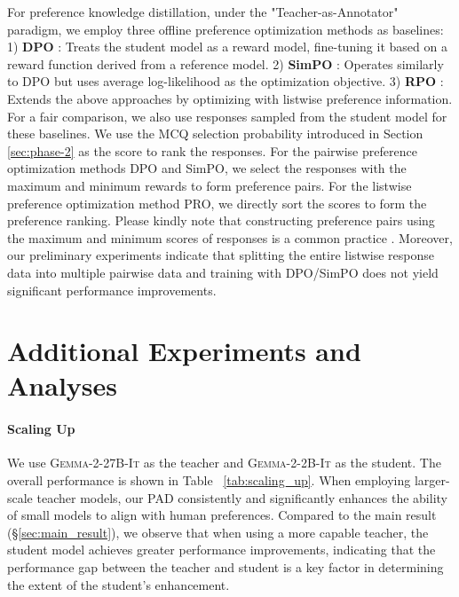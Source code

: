 For preference knowledge distillation, under the "Teacher-as-Annotator" paradigm, we employ three offline preference optimization methods as baselines:
1) \textbf{DPO} \citep{rafailov-2023-direct, tunstall-2024-zephyr}: Treats the student model as a reward model, fine-tuning it based on a reward function derived from a reference model.
2) \textbf{SimPO} \citep{meng-2024-simpo}: Operates similarly to DPO but uses average log-likelihood as the optimization objective.
3) \textbf{RPO} \citep{song-2024-pro}: Extends the above approaches by optimizing with listwise preference information. For a fair comparison, we also use responses sampled from the student model for these baselines. We use the MCQ selection probability introduced in Section \ref{sec:phase-2} as the score to rank the responses. 
For the pairwise preference optimization methods DPO and SimPO, we select the responses with the maximum and minimum rewards to form preference pairs. For the listwise preference optimization method PRO, we directly sort the scores to form the preference ranking. Please kindly note that constructing preference pairs using the maximum and minimum scores of responses is a common practice \citep{cui2023ultrafeedback, meng-2024-simpo}. Moreover, our preliminary experiments indicate that splitting the entire listwise response data into multiple pairwise data and training with DPO/SimPO does not yield significant performance improvements. 

\section{Additional Experiments and Analyses}
\label{app:additional}


\paragraph{Scaling Up} 

We use \textsc{Gemma-2-27B-It} as the teacher and \textsc{Gemma-2-2B-It} as the student. The overall performance is shown in Table ~\ref{tab:scaling_up}. When employing larger-scale teacher models, our PAD consistently and significantly enhances the ability of small models to align with human preferences. Compared to the main result (§\ref{sec:main_result}), we observe that when using a more capable teacher, the student model achieves greater performance improvements, indicating that the performance gap between the teacher and student is a key factor in determining the extent of the student's enhancement.





